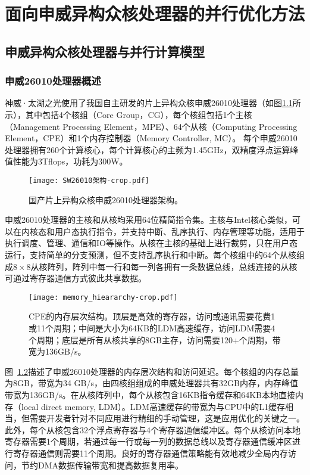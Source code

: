 \chapter{面向申威异构众核处理器的并行优化方法} %
\label{cha:面向申威异构众核处理器的并行优化方法}

\section{申威异构众核处理器与并行计算模型} %

\subsection{申威26010处理器概述} %
\label{sub:申威20610处理器概述}

神威·太湖之光使用了我国自主研发的片上异构众核申威26010处理器（如图\ref{fig:sunwaycpu}所示），其中包括4个核组（Core Group，CG）\citep {fu2016sunway}，每个核组包括1个主核（Management Processing Element，MPE）、64个从核（Computing Processing Element，CPE）和1个内存控制器（Memory Controller, MC）。 每个申威26010处理器拥有260个计算核心，每个计算核心的主频为1.45GHz，双精度浮点运算峰值性能为3Tflops，功耗为300W。

\begin{figure}[ht]
\centering
\texttt{[image: SW26010架构-crop.pdf]}
\caption{国产片上异构众核申威26010处理器架构。}
\label{fig:sunwaycpu}
\end{figure}

申威26010处理器的主核和从核均采用64位精简指令集。主核与Intel核心类似，可以在内核态和用户态执行指令，并支持中断、乱序执行、内存管理等功能，适用于执行调度、管理、通信和IO等操作。从核在主核的基础上进行裁剪，只在用户态运行，支持简单的分支预测，但不支持乱序执行和中断。每个核组中的64个从核组成$8\times8$从核阵列，阵列中每一行和每一列各拥有一条数据总线，总线连接的从核可通过寄存器通信方式彼此共享数据。

\begin{figure}[ht]
\centering
\texttt{[image: memory\_hieararchy-crop.pdf]}
\caption{CPE的内存层次结构。顶层是高效的寄存器，访问或通讯需要花费1或11个周期；中间是大小为64KB的LDM高速缓存，访问LDM需要4个周期；底层是所有从核共享的8GB主存，访问需要120+个周期，带宽为136GB/s。}
\label{fig:sunway_mem}
\end{figure}

图~\ref {fig:sunway_mem}描述了申威26010处理器的内存层次结构和访问延迟。每个核组的内存总量为8GB，带宽为34 GB/s，由四核组组成的申威处理器共有32GB内存，内存峰值带宽为136GB/s。在从核阵列中，每个从核包含16KB指令缓存和64KB本地直接内存（local direct memory, LDM）。LDM高速缓存的带宽为与CPU中的L1缓存相当，但需要开发者针对不同应用进行精细的手动管理，这是应用优化的关键之一。此外，每个从核包含32个浮点寄存器与4个寄存器通信缓冲区。每个从核访问本地寄存器需要1个周期，若通过每一行或每一列的数据总线以及寄存器通信缓冲区进行寄存器通信则需要11个周期。良好的寄存器通信策略能有效地减少全局内存访问，节约DMA数据传输带宽和提高数据复用率。

